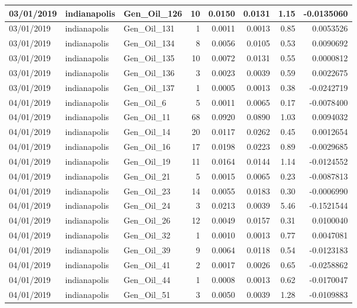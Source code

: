 \documentclass[
  letterpaper,
  DIV=11,
  numbers=noendperiod]{scrartcl}
\begin{document}
\begin{tabular}{l|l|l|r|r|r|r|r}
\hline
03/01/2019 & indianapolis & Gen\_Oil\_126 & 10 & 0.0150 & 0.0131 & 1.15 & -0.0135060\\
\hline
03/01/2019 & indianapolis & Gen\_Oil\_131 & 1 & 0.0011 & 0.0013 & 0.85 & 0.0053526\\
\hline
03/01/2019 & indianapolis & Gen\_Oil\_134 & 8 & 0.0056 & 0.0105 & 0.53 & 0.0090692\\
\hline
03/01/2019 & indianapolis & Gen\_Oil\_135 & 10 & 0.0072 & 0.0131 & 0.55 & 0.0000812\\
\hline
03/01/2019 & indianapolis & Gen\_Oil\_136 & 3 & 0.0023 & 0.0039 & 0.59 & 0.0022675\\
\hline
03/01/2019 & indianapolis & Gen\_Oil\_137 & 1 & 0.0005 & 0.0013 & 0.38 & -0.0242719\\
\hline
04/01/2019 & indianapolis & Gen\_Oil\_6 & 5 & 0.0011 & 0.0065 & 0.17 & -0.0078400\\
\hline
04/01/2019 & indianapolis & Gen\_Oil\_11 & 68 & 0.0920 & 0.0890 & 1.03 & 0.0094032\\
\hline
04/01/2019 & indianapolis & Gen\_Oil\_14 & 20 & 0.0117 & 0.0262 & 0.45 & 0.0012654\\
\hline
04/01/2019 & indianapolis & Gen\_Oil\_16 & 17 & 0.0198 & 0.0223 & 0.89 & -0.0029685\\
\hline
04/01/2019 & indianapolis & Gen\_Oil\_19 & 11 & 0.0164 & 0.0144 & 1.14 & -0.0124552\\
\hline
04/01/2019 & indianapolis & Gen\_Oil\_21 & 5 & 0.0015 & 0.0065 & 0.23 & -0.0087813\\
\hline
04/01/2019 & indianapolis & Gen\_Oil\_23 & 14 & 0.0055 & 0.0183 & 0.30 & -0.0006990\\
\hline
04/01/2019 & indianapolis & Gen\_Oil\_24 & 3 & 0.0213 & 0.0039 & 5.46 & -0.1521544\\
\hline
04/01/2019 & indianapolis & Gen\_Oil\_26 & 12 & 0.0049 & 0.0157 & 0.31 & 0.0100040\\
\hline
04/01/2019 & indianapolis & Gen\_Oil\_32 & 1 & 0.0010 & 0.0013 & 0.77 & 0.0047081\\
\hline
04/01/2019 & indianapolis & Gen\_Oil\_39 & 9 & 0.0064 & 0.0118 & 0.54 & -0.0123183\\
\hline
04/01/2019 & indianapolis & Gen\_Oil\_41 & 2 & 0.0017 & 0.0026 & 0.65 & -0.0258862\\
\hline
04/01/2019 & indianapolis & Gen\_Oil\_44 & 1 & 0.0008 & 0.0013 & 0.62 & -0.0170047\\
\hline
04/01/2019 & indianapolis & Gen\_Oil\_51 & 3 & 0.0050 & 0.0039 & 1.28 & -0.0109883\\

\end{tabular}
\end{document}

